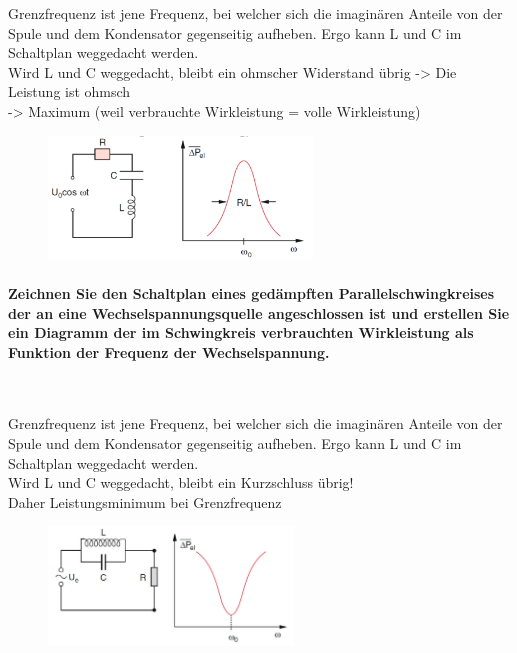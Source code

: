 \documentclass[a4paper, 11pt, ngerman, parskip=half-]{scrartcl}
\begin{document}
Grenzfrequenz ist jene Frequenz, bei welcher sich die imaginären Anteile von der Spule und dem Kondensator gegenseitig aufheben. Ergo kann L und C im Schaltplan weggedacht werden.
\\
Wird L und C weggedacht, bleibt ein ohmscher Widerstand übrig -> Die Leistung ist ohmsch \\
-> Maximum (weil verbrauchte Wirkleistung = volle Wirkleistung)
\begin{figure}[H]
    \centering
    \includegraphics[width=7cm]{image/12/1.png}
\end{figure}

\paragraph{Zeichnen Sie den Schaltplan eines gedämpften Parallelschwingkreises der an eine
    Wechselspannungsquelle angeschlossen ist und erstellen Sie ein Diagramm der im Schwingkreis
    verbrauchten Wirkleistung als Funktion der Frequenz der Wechselspannung.} ~

Grenzfrequenz ist jene Frequenz, bei welcher sich die imaginären Anteile von der Spule und dem Kondensator gegenseitig aufheben. Ergo kann L und C im Schaltplan weggedacht werden.
\\
Wird L und C weggedacht, bleibt ein Kurzschluss übrig! \\
Daher Leistungsminimum bei Grenzfrequenz
\begin{figure}[H]
    \centering
    \includegraphics[width=6.5cm]{image/12/2.1.png}
\end{figure}
\end{document}

